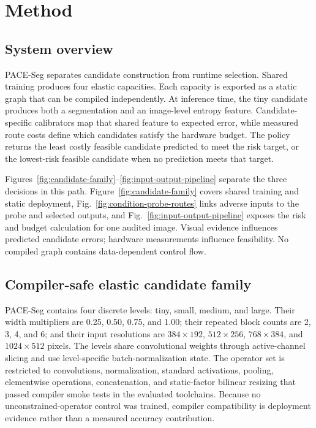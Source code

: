 \documentclass[a4paper,review,12pt]{elsarticle}
\newcommand{\method}{PACE-Seg}
\begin{document}
\section{Method}
\label{sec:method}

\subsection{System overview}
\label{sec:overview}

\method{} separates candidate construction from runtime selection. Shared training produces four elastic capacities. Each capacity is exported as a static graph that can be compiled independently. At inference time, the tiny candidate produces both a segmentation and an image-level entropy feature. Candidate-specific calibrators map that shared feature to expected error, while measured route costs define which candidates satisfy the hardware budget. The policy returns the least costly feasible candidate predicted to meet the risk target, or the lowest-risk feasible candidate when no prediction meets that target.

Figures~\ref{fig:candidate-family}--\ref{fig:input-output-pipeline} separate the three decisions in this path. Figure~\ref{fig:candidate-family} covers shared training and static deployment, Fig.~\ref{fig:condition-probe-routes} links adverse inputs to the probe and selected outputs, and Fig.~\ref{fig:input-output-pipeline} exposes the risk and budget calculation for one audited image. Visual evidence influences predicted candidate errors; hardware measurements influence feasibility. No compiled graph contains data-dependent control flow.

\subsection{Compiler-safe elastic candidate family}
\label{sec:elastic}

\method{} contains four discrete levels: tiny, small, medium, and large. Their width multipliers are 0.25, 0.50, 0.75, and 1.00; their repeated block counts are 2, 3, 4, and 6; and their input resolutions are $384\times192$, $512\times256$, $768\times384$, and $1024\times512$ pixels. The levels share convolutional weights through active-channel slicing and use level-specific batch-normalization state. The operator set is restricted to convolutions, normalization, standard activations, pooling, elementwise operations, concatenation, and static-factor bilinear resizing that passed compiler smoke tests in the evaluated toolchains. Because no unconstrained-operator control was trained, compiler compatibility is deployment evidence rather than a measured accuracy contribution.
\end{document}

